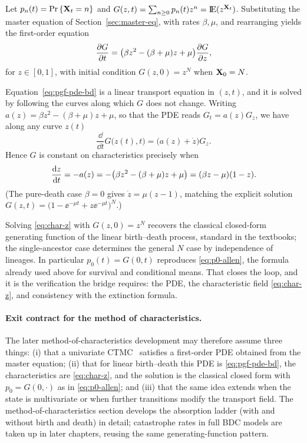 Let $p_n(t)={\text{Pr}\left\{{{\bf X}_t}=n\right\}}$ and $G(z,t)=\sum_{n\geq 0} p_n(t) z^n={\rm I}\!{\rm E}(z^{{{\bf X}_t}})$. Substituting the master equation of Section~\ref{sec:master-eq}, with rates $\beta,\mu$, and rearranging yields the first-order equation
\begin{equation}
\label{eq:pgf-pde-bd}
\displaystyle\frac{\partial G}{\partial t}
=
\bigl(\beta z^2 - (\beta+\mu)z + \mu\bigr)
\displaystyle\frac{\partial G}{\partial z},
\end{equation}
for $z\in[0,1]$, with initial condition $G(z,0)=z^{N}$ when ${\bf X}_0=N$.

Equation~\eqref{eq:pgf-pde-bd} is a linear transport equation in $(z,t)$, and it is solved by following the curves along which $G$ does not change. Writing $a(z)=\beta z^2-(\beta+\mu)z+\mu$, so that the PDE reads $G_t=a(z)G_z$, we have along any curve $z(t)$
\[
\frac{\dd}{\dd t}G\bigl(z(t),t\bigr)
=
\bigl(a(z)+\dot z\bigr)G_z.
\]
Hence $G$ is constant on characteristics precisely when
\begin{equation}
\label{eq:char-z}
\displaystyle\frac{{\rm d} z}{{\rm d} t}
=
-a(z)
=
-\bigl(\beta z^2 - (\beta+\mu)z + \mu\bigr)
=
(\beta z-\mu)(1-z).
\end{equation}
(The pure-death case $\beta=0$ gives $\dot z=\mu(z-1)$, matching the explicit solution $G(z,t)=\bigl(1-\ee^{-\mu t}+z\ee^{-\mu t}\bigr)^N$.)

Solving \eqref{eq:char-z} with $G(z,0)=z^N$ recovers the classical closed-form generating function of the linear birth--death process, standard in the textbooks; the single-ancestor case determines the general $N$ case by independence of lineages. In particular $p_0(t)=G(0,t)$ reproduces \eqref{eq:p0-allen}, the formula already used above for survival and conditional means. That closes the loop, and it is the verification the bridge requires: the PDE, the characteristic field \eqref{eq:char-z}, and consistency with the extinction formula.

\paragraph{Exit contract for the method of characteristics.}
The later method-of-characteristics development may therefore assume three things: (i) that a univariate CTMC \pgf\ satisfies a first-order PDE obtained from the master equation; (ii) that for linear birth--death this PDE is \eqref{eq:pgf-pde-bd}, the characteristics are \eqref{eq:char-z}, and the solution is the classical closed form with $p_0=G(0,\cdot)$ as in \eqref{eq:p0-allen}; and (iii) that the same idea extends when the state is multivariate or when further transitions modify the transport field. The method-of-characteristics section develops the absorption ladder (with and without birth and death) in detail; catastrophe rates in full BDC models are taken up in later chapters, reusing the same generating-function pattern.
